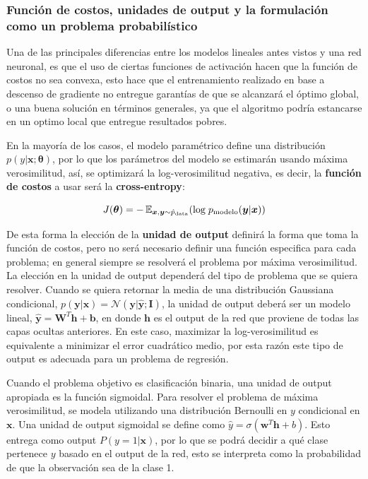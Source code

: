 \subsubsection{Funci\'on de costos, unidades de output y la formulaci\'on como un problema probabil\'istico}

Una de las principales diferencias entre los modelos lineales antes vistos y una red neuronal, es que el uso de ciertas funciones de activaci\'on hacen que la funci\'on de costos no sea convexa, esto hace que el entrenamiento realizado en base a descenso de gradiente no entregue garant\'ias de que se alcanzar\'a el \'optimo global, o una buena solución en términos generales, ya que el algoritmo podría estancarse en un optimo local que entregue resultados pobres. 

En la mayor\'ia de los casos, el modelo param\'etrico define una distribuci\'on $p(y|\bm{x}; \bm{\theta})$, por lo que los par\'ametros del modelo se estimar\'an usando m\'axima verosimilitud, as\'i, se optimizar\'a la log-verosimilitud negativa, es decir, la \textbf{funci\'on de costos} a usar ser\'a la \textbf{cross-entropy}:

\begin{equation}
J(\bm{\theta}) = -\operatorname{\mathbb{E}}_{\bm{x},\bm{y}\sim \hat{p}_{\textrm{data}}}(\textrm{log}\; p_{\textrm{modelo}}(\bm{y}|\bm{x}))
\end{equation}

De esta forma la elecci\'on de la \textbf{unidad de output} definir\'a la forma que toma la funci\'on de costos, pero no ser\'a necesario definir una funci\'on especifica para cada problema; en general siempre se resolver\'a el problema por m\'axima verosimilitud. La elecci\'on en la unidad de output depender\'a del tipo de problema que se quiera resolver. Cuando se quiera retornar la media de una distribuci\'on Gaussiana condicional, $p(\bm{y}|\bm{x}) = \mathcal{N}(\bm{y}|\hat{\bm{y}};\bm{I})$, la unidad de output deber\'a ser un modelo lineal, $\hat{\bm{y}} = \bm{W}^{T}\bm{h} + \bm{b}$, en donde $\bm{h}$ es el output de la red que proviene de todas las capas ocultas anteriores. En este caso, maximizar la log-verosimilitud es equivalente a minimizar el error cuadr\'atico medio, por esta razón este tipo de output es adecuada para un problema de regresión.

Cuando el problema objetivo es clasificaci\'on binaria, una unidad de output apropiada es la funci\'on sigmoidal. Para resolver el problema de m\'axima verosimilitud, se modela utilizando una distribuci\'on Bernoulli en $y$ condicional en $\bm{x}$. Una unidad de output sigmoidal se define como $\hat{{y}} = \sigma(\bm{w}^{T}\bm{h} + {b})$. Esto entrega como output $P(y=1|\bm{x})$, por lo que se podr\'a decidir a qu\'e clase pertenece $y$ basado en el output de la red, esto se interpreta como la probabilidad de que la observaci\'on sea de la clase 1.

